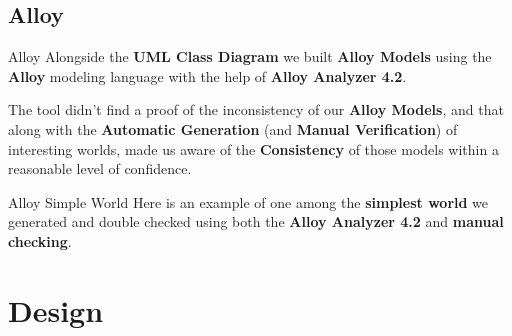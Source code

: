 \documentclass{../common/latex_classes/pdf_presentation}
\begin{document}
	\subsection{Alloy}
	\begin{frame}{Alloy}
		Alongside the \textbf{UML Class Diagram} we built \textbf{Alloy Models} using the \textbf{Alloy} modeling language with the help of \textbf{Alloy Analyzer 4.2}.\par
		The tool didn't find a proof of the inconsistency of our \textbf{Alloy Models}, and that along with the \textbf{Automatic Generation} (and \textbf{Manual Verification}) of interesting worlds, made us aware of the \textbf{Consistency} of those models within a reasonable level of confidence.
	\end{frame}
	\begin{frame}{Alloy Simple World}
		Here is an example of one among the \textbf{simplest world} we generated and double checked using both the \textbf{Alloy Analyzer 4.2} and \textbf{manual checking}.
	\end{frame}
	\section{Design}
\end{document}
